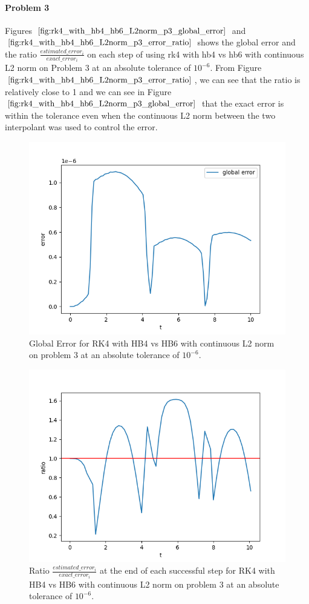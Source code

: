 \paragraph{Problem 3} Figures $\ref{fig:rk4_with_hb4_hb6_L2norm_p3_global_error}$ and $\ref{fig:rk4_with_hb4_hb6_L2norm_p3_error_ratio}$ shows the global error and the ratio $\frac{estimated\_error_i}{exact\_error_i}$ on each step of using rk4 with hb4 vs hb6 with continuous L2 norm on Problem 3 at an absolute tolerance of $10^{-6}$. From Figure $\ref{fig:rk4_with_hb4_hb6_L2norm_p3_error_ratio}$, we can see that the ratio is relatively close to 1 and we can see in Figure  $\ref{fig:rk4_with_hb4_hb6_L2norm_p3_global_error}$ that the exact error is within the tolerance even when the continuous L2 norm between the two interpolant was used to control the error.

\begin{figure}[H]
\centering
\includegraphics[width=0.7\linewidth]{./figures/rk4_with_hb4_hb6_L2norm_p3_global_error}
\caption{Global Error for RK4 with HB4 vs HB6 with continuous L2 norm on problem 3 at an absolute tolerance of $10^{-6}$.}
\label{fig:rk4_with_hb4_hb6_L2norm_p3_global_error}
\end{figure}

\begin{figure}[H]
\centering
\includegraphics[width=0.7\linewidth]{./figures/rk4_with_hb4_hb6_L2norm_p3_error_ratio}
\caption{Ratio $\frac{estimated\_error_i}{exact\_error_i}$ at the end of each successful step for RK4 with HB4 vs HB6 with continuous L2 norm on problem 3 at an absolute tolerance of $10^{-6}$.}
\label{fig:rk4_with_hb4_hb6_L2norm_p3_error_ratio}
\end{figure}

